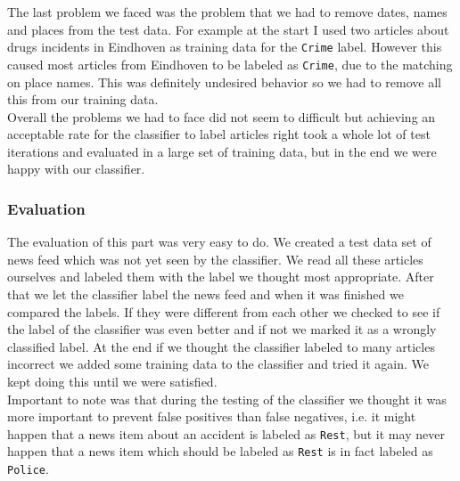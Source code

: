 The last problem we faced was the problem that we had to remove dates, names and places from the test data. For example at the start I used two articles about drugs incidents in Eindhoven as training data for the \texttt{Crime} label. However this caused most articles from Eindhoven to be labeled as \texttt{Crime}, due to the matching on place names. This was definitely undesired behavior so we had to remove all this from our training data. \\
Overall the problems we had to face did not seem to difficult but achieving an acceptable rate for the classifier to label articles right took a whole lot of test iterations and evaluated in a large set of training data, but in the end we were happy with our classifier.

\subsubsection*{Evaluation }
The evaluation of this part was very easy to do. We created a test data set of news feed which was not yet seen by the classifier. We read all these articles ourselves and labeled them with the label we thought most appropriate. After that we let the classifier label the news feed and when it was finished we compared the labels. If they were different from each other we checked to see if the label of the classifier was even better and if not we marked it as a wrongly classified label. At the end if we thought the classifier labeled to many articles incorrect we added some training data to the classifier and tried it again. We kept doing this until we were satisfied. \\
Important to note was that during the testing of the classifier we thought it was more important to prevent false positives than false negatives, i.e. it might happen that a news item about an accident is labeled as \texttt{Rest}, but it may never happen that a news item which should be labeled as \texttt{Rest} is in fact labeled as \texttt{Police}.
